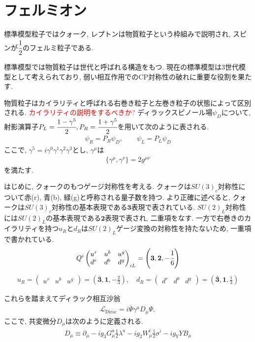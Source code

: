 \section{フェルミオン}
標準模型粒子ではクォーク, レプトンは物質粒子という枠組みで説明され, スピンが$\cfrac{1}{2}$のフェルミ粒子である.

標準模型では物質粒子は世代と呼ばれる構造をもつ.
現在の標準模型は3世代模型として考えられており, 弱い相互作用でのCP対称性の破れに重要な役割を果たす.\cite{cabibbo_unitary_1963,kobayashi_cp-violation_1973}

物質粒子はカイラリティと呼ばれる右巻き粒子と左巻き粒子の状態によって区別される.
\textcolor{red}{カイラリティの説明をするべきか?}
ディラックスピノール場$\psi_D$について, 射影演算子$P_L = \cfrac{1-\gamma^5}{2}, P_R= \cfrac{1+\gamma^5}{2}$を用いて次のように表される.
\begin{align}
  \psi_R = P_R \psi_D,\qquad \psi_L=P_L \psi_D
\end{align}
ここで, $\gamma^5= i\gamma^0 \gamma^1 \gamma^2 \gamma^3$とし, $\gamma^\mu$は
\begin{align}
  \{ \gamma^\mu, \gamma^\nu \} = 2g^{\mu\nu}
\end{align}
を満たす.

はじめに, クォークのもつゲージ対称性を考える.
クォークは$SU(3)_c$対称性について赤(r), 青(b), 緑(g)と呼称される量子数を持つ.
より正確に述べると, クォークは$SU(3)_c$対称性の基本表現である$\bm{3}$表現で表されている.
$SU(2)_L$対称性には$SU(2)_L$の基本表現である$\bm{2}$表現で表され, 二重項をなす.
一方で右巻きのカイラリティを持つ$u_R$と$d_R$は$SU(2)_L$ゲージ変換の対称性を持たないため, 一重項で書かれている.
\begin{align}
Q^i \begin{pmatrix}
      u^r & u^b & u^g \\
      d^r & d^b & d^g
    \end{pmatrix}_{iL} = \left(\bm{3}, \bm{2}, -\cfrac{1}{6}\right)
\end{align}
\begin{align}
  u_R = \begin{pmatrix} 
    u^r & u^b & u^g
  \end{pmatrix} = \left(\bm{\bar{3}} ,\bm{1}, -\frac{2}{3}\right),\quad
  d_R = \begin{pmatrix} 
    d^r & d^b & d^g
  \end{pmatrix} = \left(\bm{\bar{3}} ,\bm{1}, \frac{1}{3}\right)
\end{align}

これらを踏まえてディラック相互沙翁
\begin{align}
  \mathcal{L}_{\mathrm{Dirac}} = i\overline{\Psi}\gamma^\mu D_\mu \Psi,
\end{align}
ここで, 共変微分$D_\mu$は次のように定義される.
\begin{align}
  D_\mu \equiv \partial_\mu -ig_3 G_\mu^a \frac{1}{2}\lambda^a -ig_2 W_\mu^i\frac{1}{2}\sigma^i -ig_Y Y B_\mu
\end{align}

